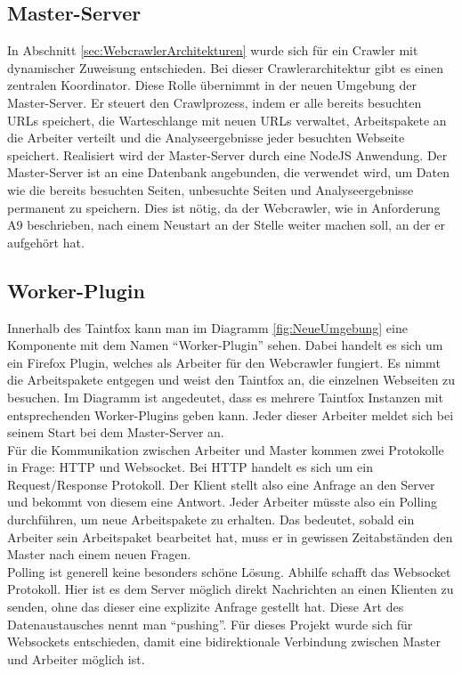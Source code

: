 \subsection{Master-Server}
In Abschnitt \ref{sec:WebcrawlerArchitekturen} wurde sich für ein Crawler mit dynamischer Zuweisung entschieden. Bei dieser Crawlerarchitektur gibt es einen zentralen Koordinator. Diese Rolle übernimmt in der neuen Umgebung der Master-Server. Er steuert den Crawlprozess, indem er alle bereits besuchten URLs speichert, die Warteschlange mit neuen URLs verwaltet, Arbeitspakete an die Arbeiter verteilt und die Analyseergebnisse jeder besuchten Webseite speichert. Realisiert wird der Master-Server durch eine NodeJS Anwendung. Der Master-Server ist an eine Datenbank angebunden, die verwendet wird, um Daten wie die bereits besuchten Seiten, unbesuchte Seiten und Analyseergebnisse permanent zu speichern. Dies ist nötig, da der Webcrawler, wie in Anforderung A9 beschrieben, nach einem Neustart an der Stelle weiter machen soll, an der er aufgehört hat.
\subsection{Worker-Plugin}
Innerhalb des Taintfox kann man im Diagramm \ref{fig:NeueUmgebung} eine Komponente mit dem Namen \enquote{Worker-Plugin} sehen. Dabei handelt es sich um ein Firefox Plugin, welches als Arbeiter für den Webcrawler fungiert. Es nimmt die Arbeitspakete entgegen und weist den Taintfox an, die einzelnen Webseiten zu besuchen. Im Diagramm ist angedeutet, dass es mehrere Taintfox Instanzen mit entsprechenden Worker-Plugins geben kann. Jeder dieser Arbeiter meldet sich bei seinem Start bei dem Master-Server an. \\
Für die Kommunikation zwischen Arbeiter und Master kommen zwei Protokolle in Frage: HTTP und Websocket. Bei HTTP handelt es sich um ein Request/Response Protokoll. Der Klient stellt also eine Anfrage an den Server und bekommt von diesem eine Antwort. Jeder Arbeiter müsste also ein Polling durchführen, um neue Arbeitspakete zu erhalten. Das bedeutet, sobald ein Arbeiter sein Arbeitspaket bearbeitet hat, muss er in gewissen Zeitabständen den Master nach einem neuen Fragen. \\
Polling ist generell keine besonders schöne Lösung. Abhilfe schafft das Websocket Protokoll. Hier ist es dem Server möglich direkt Nachrichten an einen Klienten zu senden, ohne das dieser eine explizite Anfrage gestellt hat. Diese Art des Datenaustausches nennt man \enquote{pushing}. Für dieses Projekt wurde sich für Websockets entschieden, damit eine bidirektionale Verbindung zwischen Master und Arbeiter möglich ist.\\
